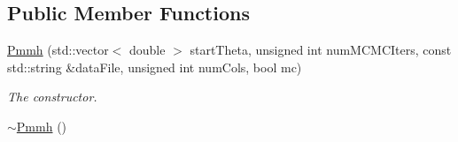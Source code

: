 \subsection*{Public Member Functions}
\begin{DoxyCompactItemize}
\item 
\hyperlink{classPmmh_abb524fcd7cf848e9a4f519a59218a63c}{Pmmh} (std\+::vector$<$ double $>$ start\+Theta, unsigned int num\+M\+C\+M\+C\+Iters, const std\+::string \&data\+File, unsigned int num\+Cols, bool mc)
\begin{DoxyCompactList}\small\item\em The constructor. \end{DoxyCompactList}\item 
\hyperlink{classPmmh_a52b058761ac6ede77eb3d8c0099e0d93}{$\sim$\+Pmmh} ()\hypertarget{classPmmh_a52b058761ac6ede77eb3d8c0099e0d93}{}\label{classPmmh_a52b058761ac6ede77eb3d8c0099e0d93}


\end{DoxyCompactItemize}
